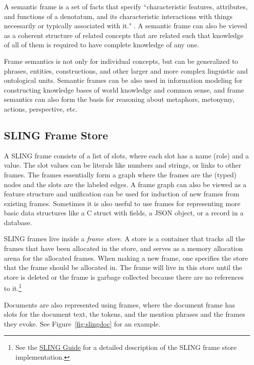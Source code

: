 \documentclass[11pt,a4paper]{article}
\begin{document}
A semantic frame is a set of facts that specify ``characteristic
features, attributes, and functions of a denotatum, and its characteristic
interactions with things necessarily or typically associated with it." \cite{alan2001}.
A semantic frame can also be vieved as a coherent structure of related concepts
that are related such that knowledge of all of them is required to have
complete knowledge of any one.

Frame semantics is not only for individual concepts, but can be generalized
to phrases, entities, constructions, and other larger and more complex linguistic
and ontological units. Semantic frames can be also used in information modeling
for constructing knowledge bases of world knowledge and common sense, and frame
semantics can also form the basis for reasoning about metaphors, metonymy,
actions, perspective, etc.

\subsection{SLING Frame Store}
\label{sec:slingstore}
A SLING frame consists of a list of slots, where each
slot has a name (role) and a value. The slot values can be literals like numbers
and strings, or links to other frames. The frames essentially form a graph where
the frames are the (typed) nodes and the slots are the labeled edges. A frame
graph can also be viewed as a feature structure \cite{carpenter2005} and
unification can be used for induction of new frames from existing frames.
Sometimes it is also useful to use frames for representing more basic data
structures like a C struct with fields, a JSON object, or a record in a
database.

SLING frames live inside a \emph{frame store}. A store is a container that
tracks all the frames that have been allocated in the store, and serves as a
memory allocation arena for the allocated frames. When making a new frame, one
specifies the store that the frame should be allocated in. The frame will live in
this store until the store is deleted or the frame is garbage collected because
there are no references to it.\footnote{See the \href{https://github.com/google/sling/blob/master/frame/README.md}{SLING Guide}
for a detailed description of the SLING frame store implementation.}

Documents are also represented using frames, where the document frame has slots
for the document text, the tokens, and the mention phrases and the frames they
evoke. See Figure~\ref{fig:slingdoc} for an example.
\end{document}
